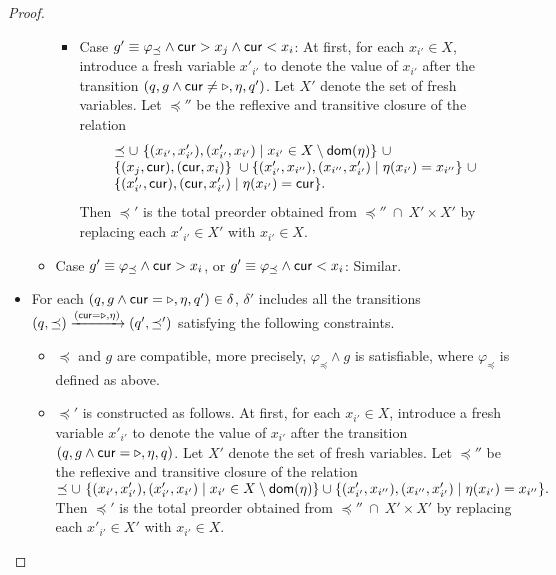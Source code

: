 \begin{appendix}
\begin{proof}
\begin{itemize}
\begin{itemize}
\begin{itemize}
\item Case $g' \equiv \varphi_{\preceq} \wedge \mathsf{cur} > x_j \wedge \mathsf{cur} < x_i$:
At first, for each $x_{i'} \in X$, introduce a fresh variable $x'_{i'}$ to denote the value of $x_{i'}$ after the transition $(q, g \wedge \mathsf{cur} \neq \triangleright, \eta, q')$. Let $X'$ denote the set of fresh variables. Let $\preceq''$ be the reflexive and transitive closure of the relation
\[
\begin{array}{l}
\preceq \cup\ \{(x_{i'}, x'_{i'}), (x'_{i'}, x_{i'}) \mid x_{i'} \in X \setminus \mathsf{dom}(\eta)\}\ \cup\\
 \{(x_j, \mathsf{cur}), (\mathsf{cur}, x_i)\}\ \cup \{(x'_{i'}, x_{i''}), (x_{i''}, x'_{i'}) \mid \eta(x_{i'})=x_{i''}\}\ \cup\\
  \{(x'_{i'}, \mathsf{cur}), (\mathsf{cur}, x'_{i'}) \mid \eta(x_{i'}) = \mathsf{cur} \}.
\end{array}
\] 
Then $\preceq'$ is the total preorder obtained from $\preceq'' \ \cap\ X' \times X'$ by replacing each $x'_{i'} \in X'$ with $x_{i'} \in X$.
\end{itemize}
%
\item Case $g' \equiv  \varphi_{\preceq} \wedge  \mathsf{cur} > x_i$, or $g' \equiv \varphi_{\preceq} \wedge  \mathsf{cur} < x_i$: Similar.
%
%
\end{itemize}

\item For each $(q, g \wedge \mathsf{cur} = \triangleright, \eta, q') \in \delta$, $\delta'$ includes all the transitions $(q, \preceq) \xrightarrow{(\mathsf{cur} = \triangleright, \eta)} (q', \preceq')$ satisfying the following constraints.
\begin{itemize}
\item $\preceq$ and $g$ are compatible, more precisely, $\varphi_{\preceq} \wedge g$ is satisfiable, where $\varphi_{\preceq}$ is defined as above.
%
\item $\preceq'$ is constructed as follows.
At first, for each $x_{i'} \in X$, introduce a fresh variable $x'_{i'}$ to denote the value of $x_{i'}$ after the transition $(q, g \wedge \mathsf{cur} = \triangleright, \eta, q)$. Let $X'$ denote the set of fresh variables. Let $\preceq''$ be the reflexive and transitive closure of the relation
$
\preceq \cup\ \{(x_{i'}, x'_{i'}), (x'_{i'}, x_{i'}) \mid x_{i'} \in X \setminus \mathsf{dom}(\eta)\}  \cup 
 \{(x'_{i'}, x_{i''}), (x_{i''}, x'_{i'}) \mid \eta(x_{i'})=x_{i''}\}.
$ 
Then $\preceq'$ is the total preorder obtained from $\preceq'' \ \cap\ X' \times X'$ by replacing each $x'_{i'} \in X'$ with $x_{i'} \in X$.
\end{itemize}
\end{itemize}


\end{proof}
\end{appendix}
